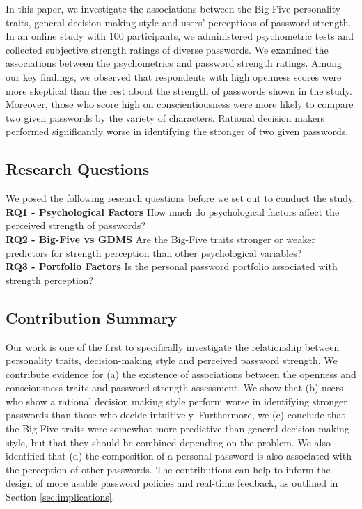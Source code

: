 In this paper, we investigate the associations between the Big-Five personality traits, general decision making style and users' perceptions of password strength. In an online study with 100 participants, we administered psychometric tests and collected subjective strength ratings of diverse passwords. We examined the associations between the psychometrics and password strength ratings. Among our key findings, we observed that respondents with high openness scores were more skeptical than the rest about the strength of passwords shown in the study. Moreover, those who score high on conscientiousness were more likely to compare two given passwords by the variety of characters. Rational decision makers performed significantly worse in identifying the stronger of two given passwords.

\subsection{Research Questions}
We posed the following research questions before we set out to conduct the study.\\
\textbf{RQ1 - Psychological Factors} How much do psychological factors affect the perceived strength of passwords?\\
\textbf{RQ2 - Big-Five vs GDMS} Are the Big-Five traits stronger or weaker predictors for strength perception than other psychological variables?\\
\textbf{RQ3 - Portfolio Factors} Is the personal password portfolio associated with strength perception?

\subsection{Contribution Summary}
Our work is one of the first to specifically investigate the relationship between personality traits, decision-making style and perceived password strength. We contribute evidence for (a) the existence of associations between the openness and consciousness traits and password strength assessment. We show that (b) users who show a rational decision making style perform worse in identifying stronger passwords than those who decide intuitively. Furthermore, we (c) conclude that the Big-Five traits were somewhat more predictive than general decision-making style, but that they should be combined depending on the problem. We also identified that (d) the composition of a personal password is also associated with the perception of other passwords. The contributions can help to inform the design of more usable password policies and real-time feedback, as outlined in Section \ref{sec:implications}.


